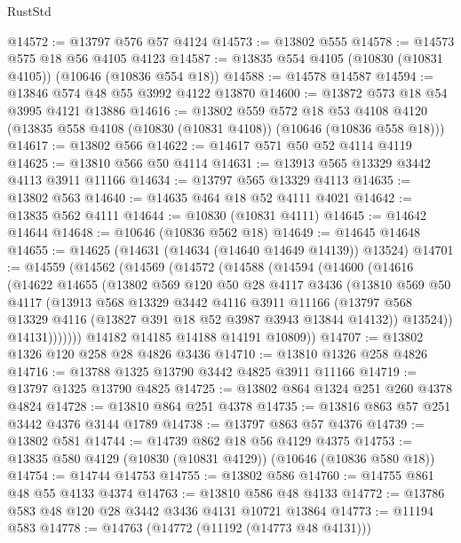 \begin{lexlean}{RustStd}
\begin{coremodule}
@14572 := @13797 @576 @57 @4124
@14573 := @13802 @555
@14578 := @14573 @575 @18 @56 @4105 @4123
@14587 := @13835 @554 @4105 (@10830 (@10831 @4105)) (@10646 (@10836 @554 @18))
@14588 := @14578 @14587
@14594 := @13846 @574 @48 @55 @3992 @4122 @13870
@14600 := @13872 @573 @18 @54 @3995 @4121 @13886
@14616 := @13802
    @559
    @572
    @18
    @53
    @4108
    @4120
    (@13835 @558 @4108 (@10830 (@10831 @4108)) (@10646 (@10836 @558 @18)))
@14617 := @13802 @566
@14622 := @14617 @571 @50 @52 @4114 @4119
@14625 := @13810 @566 @50 @4114
@14631 := @13913 @565 @13329 @3442 @4113 @3911 @11166
@14634 := @13797 @565 @13329 @4113
@14635 := @13802 @563
@14640 := @14635 @464 @18 @52 @4111 @4021
@14642 := @13835 @562 @4111
@14644 := @10830 (@10831 @4111)
@14645 := @14642 @14644
@14648 := @10646 (@10836 @562 @18)
@14649 := @14645 @14648
@14655 := @14625 (@14631 (@14634 (@14640 @14649 @14139)) @13524)
@14701 := @14559
    (@14562
      (@14569
        (@14572
          (@14588
            (@14594
              (@14600
                (@14616
                  (@14622
                    @14655
                    (@13802
                      @569
                      @120
                      @50
                      @28
                      @4117
                      @3436
                      (@13810
                        @569
                        @50
                        @4117
                        (@13913
                          @568
                          @13329
                          @3442
                          @4116
                          @3911
                          @11166
                          (@13797 @568 @13329 @4116 (@13827 @391 @18 @52 @3987 @3943 @13844 @14132))
                          @13524))
                      @14131)))))))
        @14182
        @14185
        @14188
        @14191
        @10809))
@14707 := @13802 @1326 @120 @258 @28 @4826 @3436
@14710 := @13810 @1326 @258 @4826
@14716 := @13788 @1325 @13790 @3442 @4825 @3911 @11166
@14719 := @13797 @1325 @13790 @4825
@14725 := @13802 @864 @1324 @251 @260 @4378 @4824
@14728 := @13810 @864 @251 @4378
@14735 := @13816 @863 @57 @251 @3442 @4376 @3144 @1789
@14738 := @13797 @863 @57 @4376
@14739 := @13802 @581
@14744 := @14739 @862 @18 @56 @4129 @4375
@14753 := @13835 @580 @4129 (@10830 (@10831 @4129)) (@10646 (@10836 @580 @18))
@14754 := @14744 @14753
@14755 := @13802 @586
@14760 := @14755 @861 @48 @55 @4133 @4374
@14763 := @13810 @586 @48 @4133
@14772 := @13786 @583 @48 @120 @28 @3442 @3436 @4131 @10721 @13864
@14773 := @11194 @583
@14778 := @14763 (@14772 (@11192 (@14773 @48 @4131)))

\end{coremodule}
\end{lexlean}
